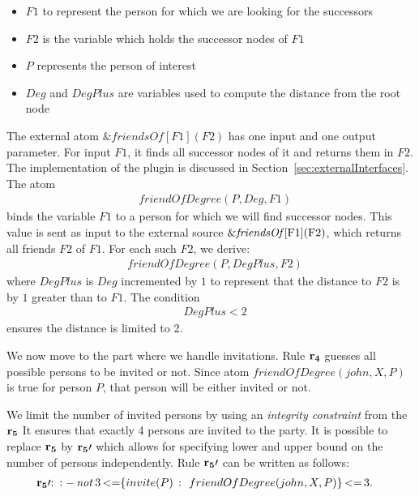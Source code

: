 \documentclass[a4paper, titlepage]{article}
\newcommand{\ext}[3]{\ensuremath{\&{#1}[#2](#3)}}
\DeclareMathOperator{\leftimpl}{:-}
\DeclareMathOperator{\nott}{\mathit{not}}
\DeclareMathOperator{\lesseq}{<=}
\newcommand{\row}[1]{%
  \ensuremath{\color{black}\ensuremath{\mathbf{#1}} \color{black}}%
}
\newcommand{\rowprefixprime}[1]{%
  \ensuremath{\color{black}\mathbf{#1\prime{:}}\ }%
}
\begin{document}
\begin{itemize}
\item $\mathit{F1}$ to represent the person for which we are 
looking for the successors

\item $\mathit{F2}$ is the variable which holds the successor 
nodes of $F1$ 

\item $P$ represents the person of interest

\item $\mathit{Deg}$ and $DegPlus$ are variables used to 
compute the distance from the root node
\end{itemize}
The external atom \ext{friendsOf}{F1}{F2} has one input and 
one output parameter. For input $\mathit{F1}$, 
it finds all successor nodes of it and returns them in 
$\mathit{F2}$. The implementation of the plugin is 
discussed in Section~\ref{sec:externalInterfaces}. The atom
\begin{align*}
& \mathit{friendOfDegree(P, Deg, F1)}
\end{align*}
binds the variable $\mathit{F1}$ to a person for which we 
will find successor nodes. This value is sent as input to 
the external source \ext{\mathit{friendsOf}}{$F1$}{$F2$}, 
which returns all friends $F2$ of $F1$. For each such $F2$, 
we derive:
\begin{align*}
& \mathit{friendOfDegree(P, DegPlus, F2)}
\end{align*} 
where $\mathit{DegPlus}$ is $\mathit{Deg}$ incremented by 
$1$ to represent that the distance to $F2$ is by $1$ 
greater than to $F1$. The condition
\begin{align*}
& \mathit{DegPlus < 2}
\end{align*}
ensures the distance is limited to 2. 

We now move to the part where we handle invitations. Rule $\row{r_4}$ guesses all possible 
persons to be invited or not. Since atom 
$\mathit{friendOfDegree(john, X, P)}$ is true for person $P$, that person will be either invited or not.

We limit the number of invited persons by using an 
\emph{integrity constraint} from the $\row{r_5}$
It ensures that exactly 4 persons are invited to the party. 
It is possible to replace $\row{r_5}$ by $\row{r_5} \prime $ which allows for specifying 
lower and upper bound on the number of persons independently. Rule $\row{r_5} \prime $ can be written as follows:
\begin{align*}
\rowprefixprime{r_5} \leftimpl \nott \thinspace & 3 \lesseq \{ invite(P) \ \colon \ friendOfDegree(john,X,P)\} \lesseq 3.
\end{align*} 
  
\end{document}
